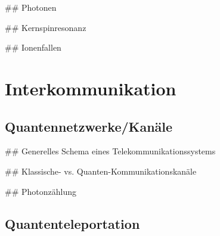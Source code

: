 ## Photonen

## Kernspinresonanz

## Ionenfallen


\section{Interkommunikation}
\label{sec:Interkommunikation}


\subsection{Quantennetzwerke/Kanäle}
\label{sec:Quantennetzwerke/Kanale}

## Generelles Schema eines Telekommunikationssystems

## Klassische- vs. Quanten-Kommunikationskanäle

## Photonzählung


\subsection{Quantenteleportation}
\label{sec:Quantenteleportation}






